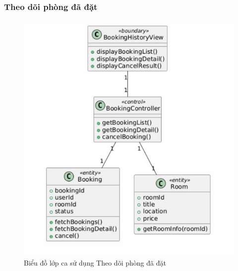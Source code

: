 \subsubsection{Theo dõi phòng đã đặt}
\begin{figure}[H]
    \centering
    \includegraphics[width=\textwidth]{img2.2/dathue.jpg}
    \caption{Biểu đồ lớp ca sử dụng Theo dõi phòng đã đặt}
\end{figure}


